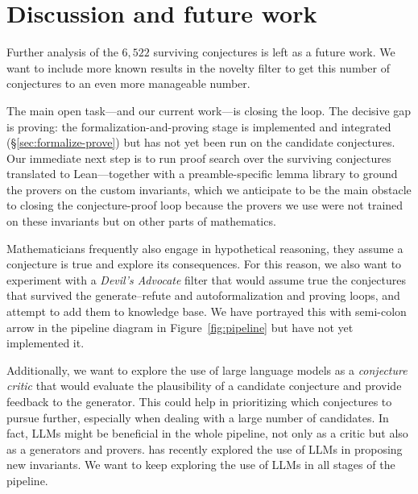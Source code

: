 \documentclass[]{ceurart}
\begin{document}
\section{Discussion and future work}
\label{sec:conclusion}

Further analysis of the $6{,}522$ surviving conjectures is left as a future work. We want to include more known results in the novelty filter to get this number of conjectures to an even more manageable number.

The main open task---and our current work---is closing the loop. The decisive gap is
proving: the formalization-and-proving stage is implemented and integrated
(\S\ref{sec:formalize-prove}) but has not yet been run on the candidate conjectures. Our immediate next
step is to run proof search over the surviving conjectures translated to Lean---together with a preamble-specific
lemma library to ground the provers on the custom invariants, which we anticipate to be the main obstacle
to closing the conjecture-proof loop because the provers we use were not trained on these invariants but on other parts of mathematics.

Mathematicians frequently also engage in hypothetical reasoning, they assume a conjecture is true and explore its consequences. For this reason, we also want to experiment with a \emph{Devil's Advocate} filter that would assume true the conjectures that survived the generate--refute and autoformalization and proving loops, and attempt to add them to knowledge base. We have portrayed this with semi-colon arrow in the pipeline diagram in Figure~\ref{fig:pipeline} but have not yet implemented it. 

Additionally, we want to explore the use of large language models as a \emph{conjecture critic} that would evaluate the plausibility of a candidate conjecture and provide feedback to the generator. This could help in prioritizing which conjectures to pursue further, especially when dealing with a large number of candidates. In fact, LLMs might be beneficial in the whole pipeline, not only as a critic but also as a generators and provers. \cite{davila2026graffiti3} has recently explored the use of LLMs in proposing new invariants. We want to keep exploring the use of LLMs in all stages of the pipeline.
\end{document}
